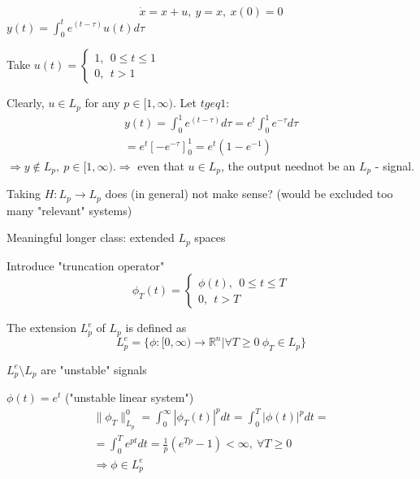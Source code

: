 \begin{Example}
\begin{equation*}
\dot{x} = x+u, \ y = x, \ x(0) = 0
\end{equation*}
$y(t) = \int_0^te^(t-\tau)u(t)d\tau$

Take $u(t) = \left\{
                \begin{array}{ll}
                  1, \ \ 0 \leq t \leq 1\\
                  0, \ \ t > 1
                \end{array}
              \right. $
              
Clearly, $u \in L_p$ for any $p \in [1,\infty)$. Let $t geq 1$: 
\begin{equation*}
\begin{split}
y(t) = \int_0^1 e^{(t-\tau)}d\tau = e^t\int_0^1e^{-\tau}d\tau \\
= e^t[-e^{-\tau}]^1_0 = e^t(1-e^{-1})
\end{split}
\end{equation*}
$\Rightarrow y \not\in L_p, \ p \in [1,\infty) $.$\Rightarrow $ even that $ u \in L_p$, the output neednot be an $L_p$ - signal.
\end{Example}

Taking $H: L_p \to L_p$ does (in general) not make sense? (would be excluded too many "relevant" systems)

Meaningful longer class: extended $L_p$ spaces

Introduce "truncation operator"
\begin{equation*}
\phi_T(t) = \left\{
                \begin{array}{ll}
                  \phi (t), \ \ 0 \leq t \leq T\\
                  0, \ \ t > T
                \end{array}
              \right. 
\end{equation*}

The extension $L^e_p$ of $L_p$ is defined as 
\begin{equation*}
L^e_p = \{ \phi: [0,\infty) \to \mathbb{R}^n | \forall T \geq 0 \ \phi_T \in L_p\}
\end{equation*}

$L^e_p \setminus L_p$ are "unstable" signals

\begin{Example}
$\phi (t) = e^t $ ("unstable linear system")
\begin{equation*}
\begin{split}
\|\phi_T\|^0_{L_p} = \int_0^{\infty} |\phi_T(t)|^pdt = \int_0^T|\phi(t)|^pdt =  \\
= \int_0^Te^{pt}dt = \frac{1}{p}(e^{Tp} - 1) < \infty, \ \forall T \geq 0 \\
\Rightarrow \phi \in L_p^e 
\end{split}
\end{equation*}
\end{Example}

